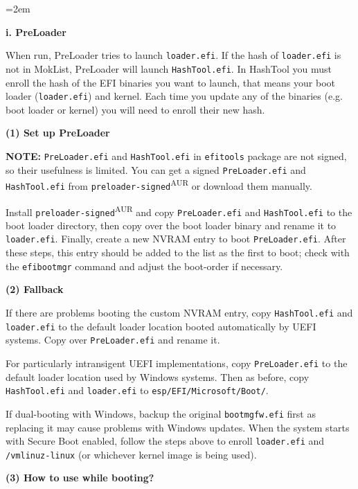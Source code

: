 \documentclass{exam-zh}
\begin{document}
\begingroup
\leftskip=2em

\textbf{i. PreLoader}

When run, PreLoader tries to launch \texttt{loader.efi}. If the hash of \texttt{loader.efi} is not in MokList, PreLoader will launch \texttt{HashTool.efi}. In HashTool you must enroll the hash of the EFI binaries you want to launch, that means your boot loader (\texttt{loader.efi}) and kernel. Each time you update any of the binaries (e.g. boot loader or kernel) you will need to enroll their new hash.

\textbf{(1) Set up PreLoader}

\textbf{NOTE:} \texttt{PreLoader.efi} and \texttt{HashTool.efi} in \texttt{efitools} package are not signed, so their usefulness is limited. You can get a signed \texttt{PreLoader.efi} and \texttt{HashTool.efi} from \texttt{preloader-signed}\textsuperscript{AUR} or download them manually.

Install \texttt{preloader-signed}\textsuperscript{AUR} and copy \texttt{PreLoader.efi} and \texttt{HashTool.efi} to the boot loader directory, then copy over the boot loader binary and rename it to \texttt{loader.efi}. Finally, create a new NVRAM entry to boot \texttt{PreLoader.efi}. After these steps, this entry should be added to the list as the first to boot; check with the \texttt{efibootmgr} command and adjust the boot-order if necessary.

\textbf{(2) Fallback}

If there are problems booting the custom NVRAM entry, copy \texttt{HashTool.efi} and \allowbreak \texttt{loader.efi} to the default loader location booted automatically by UEFI systems. Copy over \texttt{PreLoader.efi} and rename it.

For particularly intransigent UEFI implementations, copy \texttt{PreLoader.efi} to the default loader location used by Windows systems. Then as before, copy \texttt{HashTool.efi} and \texttt{loader.efi} to \texttt{esp/EFI/Microsoft/Boot/}.

If dual-booting with Windows, backup the original \texttt{bootmgfw.efi} first as replacing it may cause problems with Windows updates. When the system starts with Secure Boot enabled, follow the steps above to enroll \texttt{loader.efi} and \texttt{/vmlinuz-linux} (or whichever kernel image is being used).

\textbf{(3) How to use while booting?}
\end{document}
